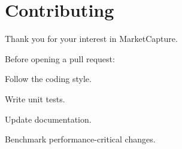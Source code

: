\chapter{Contributing }
\hypertarget{md_CONTRIBUTING}{}\label{md_CONTRIBUTING}
\label{md_CONTRIBUTING_autotoc_md3}%
%


Thank you for your interest in Market\+Capture.

Before opening a pull request\+:


\begin{DoxyItemize}
\item Follow the coding style.
\item Write unit tests.
\item Update documentation.
\item Benchmark performance-\/critical changes. 
\end{DoxyItemize}